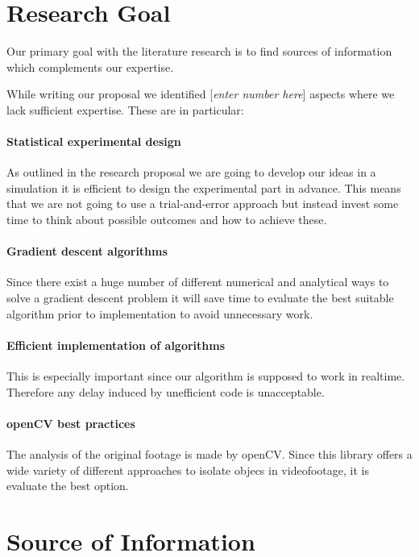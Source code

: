 \documentclass[titlepage, a4paper, 11pt]{scrartcl}
\begin{document}
\section{Research Goal}

Our primary goal with the literature research is to find sources of information which complements our expertise. 

While writing our proposal we identified [\textit{enter number here}] aspects where we lack sufficient expertise.
These are in particular:

\paragraph{Statistical experimental design}

As outlined in the research proposal we are going to develop our ideas in a simulation it is efficient to design the experimental part in advance.
This means that we are not going to use a trial-and-error approach but instead invest some time to think about possible outcomes and how to achieve these.

\paragraph{Gradient descent algorithms}

Since there exist a huge number of different numerical and analytical ways to solve a gradient descent problem it will save time to evaluate the best
suitable algorithm prior to implementation to avoid unnecessary work.

\paragraph{Efficient implementation of algorithms}

This is especially important since our algorithm is supposed to work in realtime.
Therefore any delay induced by unefficient code is unacceptable.

\paragraph{openCV best practices}

The analysis of the original footage is made by openCV. Since this library offers a wide variety of different approaches to isolate objecs in videofootage,
it is evaluate the best option.


\section{Source of Information}
\end{document}
